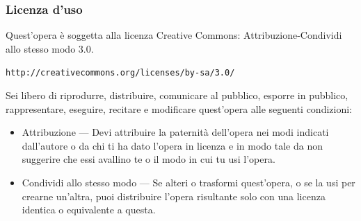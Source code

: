 \begin{frame}[containsverbatim]\frametitle{Licenza d'uso}
  \small

  Quest'opera {\`e} soggetta alla licenza Creative Commons: Attribuzione-Condividi
  allo stesso modo 3.0.

  \verb+http://creativecommons.org/licenses/by-sa/3.0/+

  Sei libero di riprodurre, distribuire, comunicare al pubblico, esporre in
  pubblico, rappresentare, eseguire, recitare e modificare quest'opera
  alle seguenti condizioni:
  \begin{itemize}
  \item
    Attribuzione — Devi attribuire la paternit{\`a} dell'opera nei modi indicati
    dall'autore o da chi ti ha dato l'opera in licenza e in modo tale da non
    suggerire che essi avallino te o il modo in cui tu usi l'opera.
  \item
    Condividi allo stesso modo — Se alteri o trasformi quest'opera, o se la usi
    per crearne un'altra, puoi distribuire l'opera risultante solo con una licenza
    identica o equivalente a  questa.
  \end{itemize}
  \vspace*{1cm}
\end{frame}



